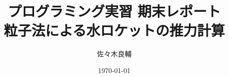 \documentclass[uplatex,a4j,11pt]{jsarticle}
\begin{document}
\title{プログラミング実習 期末レポート\\
\large 粒子法による水ロケットの推力計算}
\author{佐々木良輔}
\date{\today}
\maketitle
\newpage








\newpage

\end{document}
